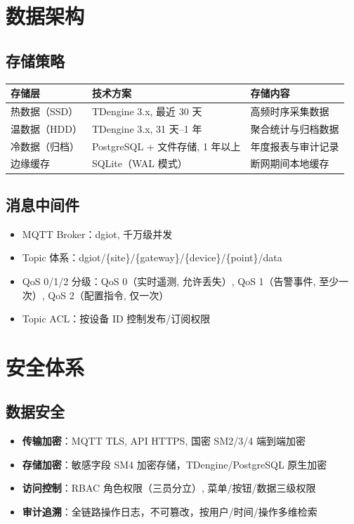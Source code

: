 \documentclass[11pt,a4paper]{ctexart}
\begin{document}
\section{数据架构}

\subsection{存储策略}

\begin{table}[H]\centering
\begin{tabular}{p{3.0cm} p{5.5cm} p{4.0cm}}
\toprule
\textbf{存储层} & \textbf{技术方案} & \textbf{存储内容} \\
\midrule
热数据（SSD） & TDengine 3.x, 最近 30 天 & 高频时序采集数据 \\
温数据（HDD） & TDengine 3.x, 31 天--1 年 & 聚合统计与归档数据 \\
冷数据（归档） & PostgreSQL + 文件存储, 1 年以上 & 年度报表与审计记录 \\
边缘缓存 & SQLite（WAL 模式） & 断网期间本地缓存 \\
\bottomrule
\end{tabular}
\end{table}

\subsection{消息中间件}

\begin{itemize}[leftmargin=*]
  \item MQTT Broker：dgiot, 千万级并发
  \item Topic 体系：dgiot/\{site\}/\{gateway\}/\{device\}/\{point\}/data
  \item QoS 0/1/2 分级：QoS 0（实时遥测, 允许丢失）, QoS 1（告警事件, 至少一次）, QoS 2（配置指令, 仅一次）
  \item Topic ACL：按设备 ID 控制发布/订阅权限
\end{itemize}

\section{安全体系}

\subsection{数据安全}

\begin{itemize}[leftmargin=*]
  \item \textbf{传输加密}：MQTT TLS, API HTTPS, 国密 SM2/3/4 端到端加密
  \item \textbf{存储加密}：敏感字段 SM4 加密存储，TDengine/PostgreSQL 原生加密
  \item \textbf{访问控制}：RBAC 角色权限（三员分立）, 菜单/按钮/数据三级权限
  \item \textbf{审计追溯}：全链路操作日志，不可篡改，按用户/时间/操作多维检索
\end{itemize}
\end{document}
